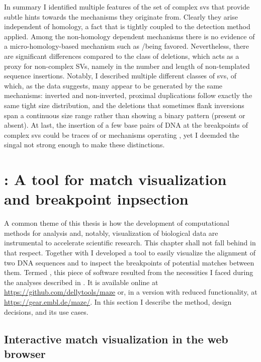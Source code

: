 In summary I identified multiple features of the set of complex \acp{sv} that
provide subtle hints towards the mechanisms they originate from. Clearly they
arise independent of homology, a fact that is tightly coupled to the detection
method applied. Among the non-homology dependent mechanisms there is no evidence
of a micro-homology-based mechanism such as \fostes/\mmbir being favored.
Nevertheless, there are significant differences compared to the class of
deletions, which acts as a proxy for non-complex SVs, namely in the number and
length of non-templated sequence insertions. Notably, I described multiple
different classes of \acp{sv}, of which, as the data suggests, many appear to be
generated by the same mechanisms: inverted and non-inverted, proximal
duplications follow exactly the same tight size distribution, and the deletions
that sometimes flank inversions span a continuous size range rather than showing
a binary pattern (present or absent). At last, the insertion of a few base pairs
of DNA at the breakpoints of complex \acp{sv} could be traces of \nhej or \bir
mechanisms operating \citep{Hastings2009,Carvalho2016}, yet I deemded the singal
not strong enough to make these distinctions.







\section{\texorpdfstring{\maze}{Maze}: A tool for match visualization and breakpoint inpsection}
\label{sec:maze}

A common theme of this thesis is how the development of computational methods
for analysis and, notably, visualization of biological data are instrumental to
accelerate scientific research. This chapter shall not fall behind in that
respect. Together with \markus I developed a tool to easily visualize the
alignment of two DNA sequences and to inspect the breakpoints of potential
matches between them. Termed \maze, this piece of software resulted from the
necessities I faced during the analyses described in
. It is available online at
\url{https://github.com/dellytools/maze} or, in a version with reduced
functionality, at \url{https://gear.embl.de/maze/}. In this section I describe
the method, design decisions, and its use cases.




\subsection{Interactive match visualization in the web browser}
\label{sec:maze_dotplot}

